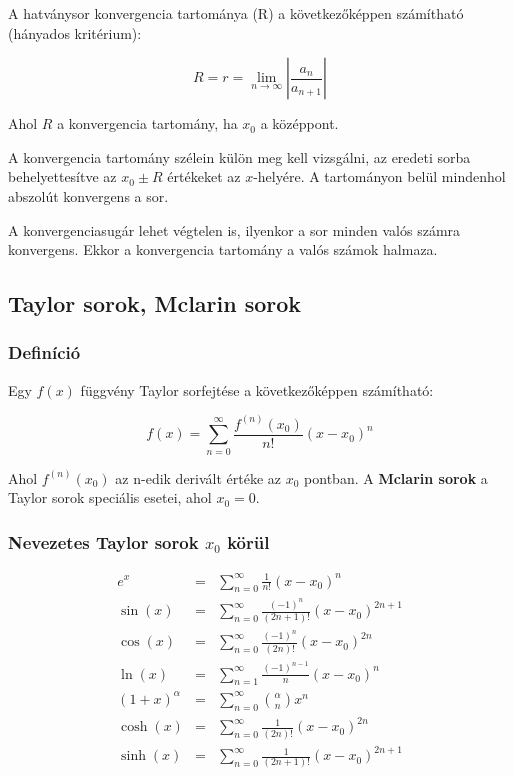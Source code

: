 \documentclass{article}
\begin{document}
\vspace{4mm}

A hatványsor konvergencia tartománya (R) a következőképpen számítható (hányados kritérium):

\begin{equation*}
    R = r =\lim_{n \to \infty} \left\lvert \frac{a_n}{a_{n+1}} \right\rvert
\end{equation*}

Ahol $R$ a konvergencia tartomány, ha $x_0$ a középpont.

\vspace{4mm}

A konvergencia tartomány szélein külön meg kell vizsgálni, az eredeti sorba behelyettesítve az $x_0 \pm R$ értékeket az $x$-helyére. A tartományon belül mindenhol abszolút konvergens a sor.

\vspace{4mm}

A konvergenciasugár lehet végtelen is, ilyenkor a sor minden valós számra konvergens. Ekkor a konvergencia tartomány a valós számok halmaza.

\newpage

\subsection{Taylor sorok, Mclarin sorok}

\subsubsection{Definíció}

Egy $f(x)$ függvény Taylor sorfejtése a következőképpen számítható:

\begin{equation*}
    f(x) = \sum_{n=0}^{\infty} \frac{f^{(n)}(x_0)}{n!} (x - x_0)^n
\end{equation*}

Ahol $f^{(n)}(x_0)$ az n-edik derivált értéke az $x_0$ pontban.
A \textbf{Mclarin sorok} a Taylor sorok speciális esetei, ahol $x_0 = 0$.

\subsubsection{Nevezetes Taylor sorok $x_0$ körül}

\begin{eqnarray*}
    e^x &=& \sum_{n=0}^{\infty} \frac{1}{n!} (x-x_0)^n \\
    \sin(x) &=& \sum_{n=0}^{\infty} \frac{(-1)^n}{(2n+1)!} (x-x_0)^{2n+1} \\
    \cos(x) &=& \sum_{n=0}^{\infty} \frac{(-1)^n}{(2n)!} (x-x_0)^{2n} \\
    \ln(x) &=& \sum_{n=1}^{\infty} \frac{(-1)^{n-1}}{n} (x-x_0)^n \\
    (1+x)^\alpha &=& \sum_{n=0}^{\infty} \binom{\alpha}{n} x^n \\
    \cosh(x) &=& \sum_{n=0}^{\infty} \frac{1}{(2n)!} (x-x_0)^{2n} \\
    \sinh(x) &=& \sum_{n=0}^{\infty} \frac{1}{(2n+1)!} (x-x_0)^{2n+1} \\
\end{eqnarray*}
\end{document}
